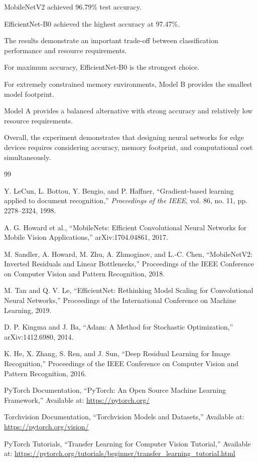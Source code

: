 \documentclass[12pt,a4paper]{report}
\begin{document}
MobileNetV2 achieved 96.79\% test accuracy.

EfficientNet-B0 achieved the highest accuracy at 97.47\%.

The results demonstrate an important trade-off between
classification performance and resource requirements.

For maximum accuracy, EfficientNet-B0 is the strongest choice.

For extremely constrained memory environments, Model B provides
the smallest model footprint.

Model A provides a balanced alternative with strong accuracy
and relatively low resource requirements.

Overall, the experiment demonstrates that designing neural
networks for edge devices requires considering accuracy,
memory footprint, and computational cost simultaneously.



\clearpage

\begin{thebibliography}{99}

Y. LeCun, L. Bottou, Y. Bengio, and P. Haffner,
``Gradient-based learning applied to document recognition,''
\textit{Proceedings of the IEEE},
vol. 86, no. 11, pp. 2278--2324, 1998.

A. G. Howard et al.,
``MobileNets: Efficient Convolutional Neural Networks for Mobile
Vision Applications,''
arXiv:1704.04861, 2017.

M. Sandler, A. Howard, M. Zhu, A. Zhmoginov, and L.-C. Chen,
``MobileNetV2: Inverted Residuals and Linear Bottlenecks,''
Proceedings of the IEEE Conference on Computer Vision and Pattern
Recognition, 2018.

M. Tan and Q. V. Le,
``EfficientNet: Rethinking Model Scaling for Convolutional Neural
Networks,''
Proceedings of the International Conference on Machine Learning,
2019.

D. P. Kingma and J. Ba,
``Adam: A Method for Stochastic Optimization,''
arXiv:1412.6980, 2014.

K. He, X. Zhang, S. Ren, and J. Sun,
``Deep Residual Learning for Image Recognition,''
Proceedings of the IEEE Conference on Computer Vision and Pattern
Recognition, 2016.

PyTorch Documentation,
``PyTorch: An Open Source Machine Learning Framework,''
Available at:
\url{https://pytorch.org/}

Torchvision Documentation,
``Torchvision Models and Datasets,''
Available at:
\url{https://pytorch.org/vision/}

PyTorch Tutorials,
``Transfer Learning for Computer Vision Tutorial,''
Available at:
\url{https://pytorch.org/tutorials/beginner/transfer_learning_tutorial.html}

\end{thebibliography}
\end{document}
